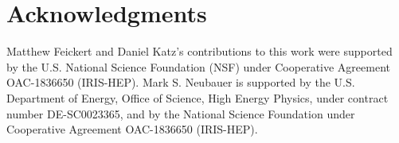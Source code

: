 \section*{Acknowledgments}\label{sec:acknowledgments}
Matthew Feickert and Daniel Katz's contributions to this work were supported by the U.S. National Science Foundation (NSF) under Cooperative Agreement OAC-1836650 (IRIS-HEP).
Mark S. Neubauer is supported by the U.S. Department of Energy, Office of Science, High Energy Physics, under contract number DE-SC0023365, and by the National Science Foundation under Cooperative Agreement OAC-1836650 (IRIS-HEP).
